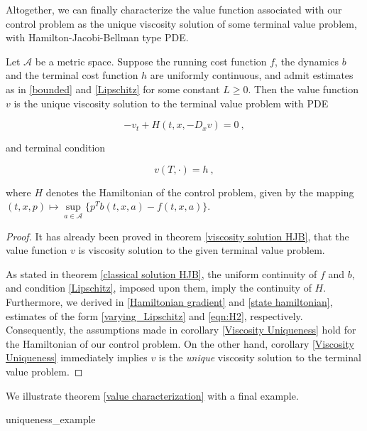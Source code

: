 	  Altogether, we can finally characterize the value function associated with our control problem as the unique viscosity solution of some terminal value problem, with Hamilton-Jacobi-Bellman type PDE.
	  
	  \begin{theorem}
	  	\label{value characterization}
	  	Let $ \mathcal{A} $ be a metric space. Suppose the running cost function $ f $, the dynamics $ b $ and the terminal cost function $ h $ are uniformly continuous, and admit estimates as in \eqref{bounded} and \eqref{Lipschitz} for some constant $ L \geq 0 $. Then the value function $ v $ is the unique viscosity solution to the terminal value problem with PDE
	  	
	  	\begin{equation*}
	  	-v_t + H(t, x, -D_x v) = 0 \ ,
	  	\end{equation*}
	  	
	  	and terminal condition
	  	
	  	\begin{equation*}
	  	v(T, \cdot) = h \ ,
	  	\end{equation*}
	  	
	  	where $ H $ denotes the Hamiltonian of the control problem, given by the mapping $ (t, x, p) \mapsto \sup\limits_{a \in \mathcal{A}} \bigg\{ p^{T} b(t, x, a) - f(t, x, a) \bigg\} $.
	  	
	  	\begin{proof}
	  		It has already been proved in theorem \ref{viscosity solution HJB}, that the value function $ v $ is viscosity solution to the given terminal value problem. 
	  		
	  		As stated in theorem \ref{classical solution HJB}, the uniform continuity of $ f $ and $ b $, and condition \eqref{Lipschitz}, imposed upon them, imply the continuity of $ H $. Furthermore, we derived in \ref{Hamiltonian gradient} and \ref{state hamiltonian}, estimates of the form \eqref{varying_Lipschitz} and \eqref{eqn:H2}, respectively. Consequently, the assumptions made in corollary \ref{Viscosity Uniqueness} hold for the Hamiltonian of our control problem. On the other hand, corollary \ref{Viscosity Uniqueness} immediately implies $ v $ is the \emph{unique} viscosity solution to the terminal value problem.
	  	\end{proof}
	  \end{theorem}
  
	We illustrate theorem \ref{value characterization} with a final example.
	
	{uniqueness_example}	  